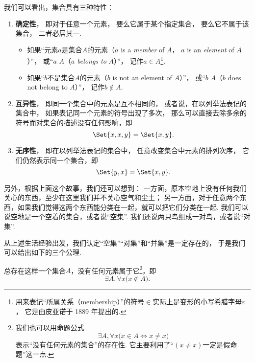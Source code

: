 我们可以看出，集合具有三种特性：
\begin{enumerate}
	\item {\bf 确定性}，
	即对于任意一个元素，
	要么它属于某个指定集合，
	要么它不属于该集合，
	二者必居其一.
	\begin{itemize}
		\item 如果“元素\(a\)是集合\(A\)的元素（\(a\) is a \emph{member} of \(A\)，
		\(a\) is an \emph{element} of \(A\)）”，
		或“\(a\) \(A\)（\(a\) \emph{belongs to} \(A\)）”，
		记作\(a \in A\)\footnote{%
		用来表记“所属关系（membership）”的符号\(\in\)实际上是变形的小写希腊字母\(\varepsilon\)，%
		它是由皮亚诺于 1889 年提出的.}.

		\item 如果“\(b\)不是集合\(A\)的元素（\(b\) is not an element of \(A\)）”，%
		或“\(b\) \(A\)（\(b\) does not belong to \(A\)）”，%
		记作\(b \notin A\).
	\end{itemize}

	\item {\bf 互异性}，
	即同一个集合中的元素是互不相同的，
	或者说，在以列举法表记的集合中，
	如果表记同一个元素的符号出现了多次，
	那么可以直接去除多余的符号而对集合的描述没有任何影响，即\[
		\Set{ x, x, y } = \Set{ x, y }.
	\]

	\item {\bf 无序性}，
	即在以列举法表记的集合中，
	任意改变集合中元素的排列次序，
	它们仍然表示同一个集合，即\[
		\Set{ y, x } = \Set{ x, y }.
	\]
\end{enumerate}



另外，根据上面这个故事，我们还可以想到：
一方面，原本空地上没有任何我们关心的东西，至少在这里我们并不关心空气和尘土；
另一方面，对于任意两个东西，如果我们觉得这两个东西能分类在一起，就可以把它们分类在一起.
我们可以说空地是一个空着的集合，或者说“空集”.
我们还说两只鸟组成一对鸟，或者说“对集”.

从上述生活经验出发，我们认定“空集”“对集”和“并集”是一定存在的，
于是我们可以给出如下的三个公理.

\begin{axiom}[空集公理]\label{axiom:集合论.空集公理}
总存在这样一个集合\(A\)，没有任何元素属于它\footnote{%
我们也可以用命题公式\[
	\exists A, \forall x \bigl( x \in A \iff x \neq x \bigr)
\]表示“没有任何元素的集合”的存在性.
它主要利用了“\((x \neq x)\)一定是假命题”这一点.
}，即\[
	\exists A, \forall x \bigl( x \notin A \bigr).
\]
\end{axiom}

